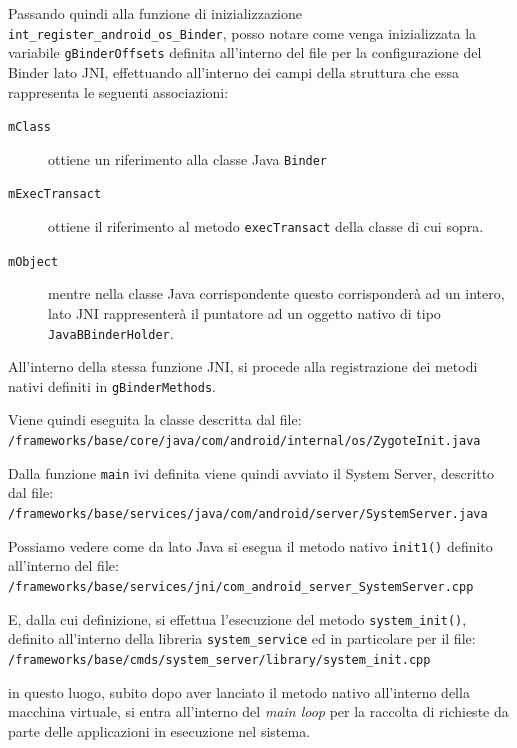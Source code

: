 Passando quindi alla funzione di inizializzazione \texttt{\small int\_register\_android\_os\_Binder},
posso notare come venga inizializzata la variabile \texttt{\small gBinderOffsets}
definita all'interno del file per la configurazione del Binder lato JNI, effettuando
all'interno dei campi della struttura che essa rappresenta le seguenti associazioni:
\begin{description}
\item[\texttt{\small mClass}] ottiene un riferimento alla classe Java \texttt{\small Binder}
\item[\texttt{\small mExecTransact}] ottiene il riferimento al metodo \texttt{\small execTransact} della
	classe di cui sopra.
\item[\texttt{\small mObject}] mentre nella classe Java corrispondente questo corrisponderà
	ad un intero, lato JNI rappresenterà il puntatore ad un oggetto nativo
	di tipo \texttt{\small JavaBBinderHolder}.
\end{description}
All'interno della stessa funzione JNI, si procede alla registrazione dei 
metodi nativi definiti in \texttt{\small gBinderMethods}.

Viene quindi eseguita la classe descritta dal file:\\
\texttt{\small \AOSP/frameworks/base/core/java/com/android/internal/os/ZygoteInit.java}

Dalla funzione \texttt{\small main} ivi definita viene quindi avviato il System
Server, descritto dal file:\\
\texttt{\small \AOSP/frameworks/base/services/java/com/android/server/SystemServer.java}

Possiamo vedere come da lato Java si esegua il metodo nativo \texttt{\small init1()}
definito all'interno del file:\\
\texttt{\small \AOSP/frameworks/base/services/jni/com\_android\_server\_SystemServer.cpp}

E, dalla cui definizione, si effettua l'esecuzione del metodo \texttt{\small system\_init()},
definito all'interno della libreria \texttt{\small system\_service} ed in particolare 
per il file:\\
\texttt{\small \AOSP/frameworks/base/cmds/system\_server/library/system\_init.cpp}

in questo luogo, subito dopo aver lanciato il metodo nativo all'interno della
macchina virtuale, si entra all'interno del \textit{main loop} per la raccolta
di richieste da parte delle applicazioni in esecuzione
nel sistema.


